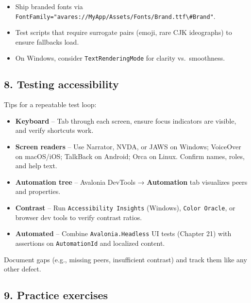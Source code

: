 \begin{itemize}
\tightlist
\item
  Ship branded fonts via
  \passthrough{\lstinline!FontFamily="avares://MyApp/Assets/Fonts/Brand.ttf\#Brand"!}.
\item
  Test scripts that require surrogate pairs (emoji, rare CJK ideographs)
  to ensure fallbacks load.
\item
  On Windows, consider \passthrough{\lstinline!TextRenderingMode!} for
  clarity vs.~smoothness.
\end{itemize}

\subsection{8. Testing accessibility}\label{testing-accessibility}

Tips for a repeatable test loop:

\begin{itemize}
\tightlist
\item
  \textbf{Keyboard} -- Tab through each screen, ensure focus indicators
  are visible, and verify shortcuts work.
\item
  \textbf{Screen readers} -- Use Narrator, NVDA, or JAWS on Windows;
  VoiceOver on macOS/iOS; TalkBack on Android; Orca on Linux. Confirm
  names, roles, and help text.
\item
  \textbf{Automation tree} -- Avalonia DevTools → \textbf{Automation}
  tab visualizes peers and properties.
\item
  \textbf{Contrast} -- Run
  \passthrough{\lstinline!Accessibility Insights!} (Windows),
  \passthrough{\lstinline!Color Oracle!}, or browser dev tools to verify
  contrast ratios.
\item
  \textbf{Automated} -- Combine
  \passthrough{\lstinline!Avalonia.Headless!} UI tests (Chapter 21) with
  assertions on \passthrough{\lstinline!AutomationId!} and localized
  content.
\end{itemize}

Document gaps (e.g., missing peers, insufficient contrast) and track
them like any other defect.

\subsection{9. Practice exercises}\label{practice-exercises-9}

